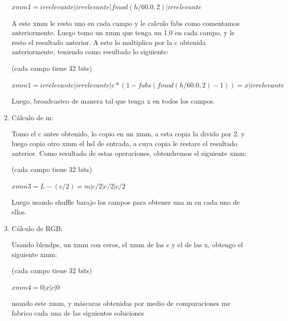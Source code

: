 \documentclass[a4paper]{article}
\begin{document}
\begin{enumerate}
\vspace*{0.3cm}	

$xmm1 = irrelevante|irrelevante|fmod(h/60.0 , 2)|irrelevante$ 		
		
\vspace*{0.3cm}		
		
	A este xmm le resto uno en cada campo y le calculo fabs como comentamos anteriormente. Luego tomo un xmm que tenga un 1.0 en cada campo, y le resto el resultado anterior. A esto lo multiplico por la c obtenida anteriormente, teniendo como resultado lo siguiente:
	
\vspace*{0.3cm}

(cada campo tiene 32 bits)	
	
\vspace*{0.3cm}	

	$xmm1 = irrelevante|irrelevante|c*(1-fabs(fmod(h/60.0 , 2) -1))=x|irrelevante$
		
\vspace*{0.3cm}
	
Luego, broadcasteo de manera tal que tenga x en todos los campos.	
	
	\item Cálculo de m:
	
Tomo el c antes obtenido, lo copio en un xmm, a esta copia la divido por 2, y luego copio otro xmm el hsl de entrada, a cuya copia le restare el resultado anterior. Como resultado de estas operaciones, obtendremos el siguiente xmm:

\vspace*{0.3cm}

(cada campo tiene 32 bits)	
	
\vspace*{0.3cm}	

$xmm3 = L-(c/2)=m | c/2 | c/2 | c/2$
	
\vspace*{0.3cm}


	Luego usando shuffle barajo los campos para obtener una m en cada uno de ellos.
	
	\item Cálculo de RGB:
	
	Usando blendps, un xmm con ceros, el xmm de las c y el de las x, obtengo el siguiente xmm:
	
\vspace*{0.3cm}

(cada campo tiene 32 bits)	
	
\vspace*{0.3cm}	
	
	$xmm4 = 0|x|c|0	$
	
\vspace*{0.3cm}

usando este xmm, y máscaras obtenidas por medio de comparaciones me fabrico cada una de las siguientes soluciones

\end{enumerate}
\end{document}
